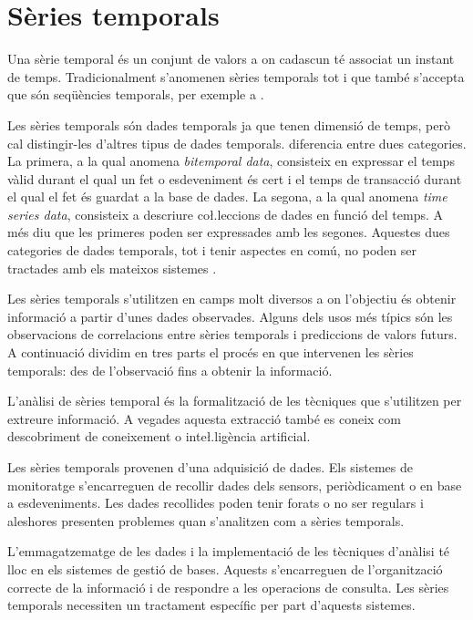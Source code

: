 \section{Sèries temporals}

Una sèrie temporal és un conjunt de valors a on cadascun té associat un instant de temps.
Tradicionalment s'anomenen sèries temporals tot i que també s'accepta que són seqüències temporals, per exemple a \cite{last:hetland}.

Les sèries temporals són dades temporals ja que tenen dimensió de temps, però cal distingir-les d'altres tipus de dades temporals. \textcite{assfalg08:thesis} diferencia entre dues categories.  La primera, a la qual anomena \emph{bitemporal data}, consisteix en expressar el temps vàlid durant el qual un fet o esdeveniment és cert i el temps de transacció durant el qual el fet és guardat a la base de dades. La segona, a la qual anomena \emph{time series data}, consisteix a descriure co\l.leccions de dades en funció del temps. A més diu que les primeres poden ser expressades amb les segones. 
Aquestes dues categories de dades temporals, tot i tenir aspectes en comú, no poden ser tractades amb els mateixos sistemes \parencite{schmidt95}.  


Les sèries temporals s'utilitzen en camps molt diversos a on l'objectiu és obtenir informació a partir d'unes dades observades. Alguns dels usos més típics són les observacions de correlacions entre sèries temporals i prediccions de valors futurs. A continuació dividim en tres parts el procés en que intervenen les sèries temporals:  des de l'observació fins a obtenir la informació. 
 
L'anàlisi de sèries temporal és la formalització de les tècniques que s'utilitzen per extreure informació. A vegades aquesta extracció també es coneix com descobriment de coneixement o inte\l.ligència artificial. 

Les sèries temporals provenen d'una adquisició de dades. Els sistemes de monitoratge s'encarreguen de recollir dades dels sensors, periòdicament o en base a esdeveniments. Les dades recollides poden tenir forats o no ser regulars i aleshores presenten problemes quan s'analitzen com a sèries temporals.

L'emmagatzematge de les dades i la implementació de les tècniques d'anàlisi té lloc en els sistemes de gestió de bases. Aquests s'encarreguen de l'organització correcte de la informació i de respondre a les operacions de consulta. Les sèries temporals necessiten un tractament específic per part d'aquests sistemes.



